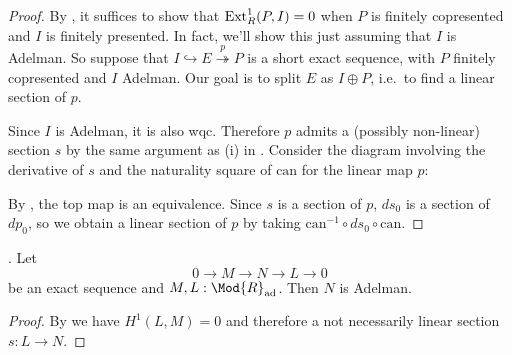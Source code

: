 \begin{proof}
  By , it suffices to show that
  $\textup{Ext}^1_R(P,I) = 0$ when $P$ is finitely copresented and $I$ is finitely presented.
  In fact, we'll show this just assuming that $I$ is Adelman.
  So suppose that $I \hookrightarrow E \overset{p}{\twoheadrightarrow} P$ is a short exact sequence, with $P$ finitely copresented and $I$ Adelman.
  Our goal is to split $E$ as $I \oplus P$, i.e.\ to find a linear section of $p$.

  Since $I$ is Adelman, it is also wqc.
  Therefore $p$ admits a (possibly non-linear) section $s$ by the same argument as (i) in .
  Consider the diagram involving the derivative of $s$ and the naturality square of $\mathrm{can}$ for the linear map $p$:
  \begin{center}
  \end{center}
  By , the top map is an equivalence.
  Since $s$ is a section of $p$, $ds_0$ is a section of $dp_0$, so
  we obtain a linear section of $p$ by taking $\mathrm{can}^{-1}\circ ds_0 \circ \mathrm{can}$.
\end{proof}

\begin{lemma}
  .
  Let
  \[
    0\to M \to N \to L \to 0
  \]
  be an exact sequence and $M,L:\Mod{R}_{\mathrm{ad}}$.
  Then $N$ is Adelman.
\end{lemma}

\begin{proof}
  By  we have $H^1(L,M)=0$ and therefore a not necessarily linear section $s:L\to N$.
\end{proof}

